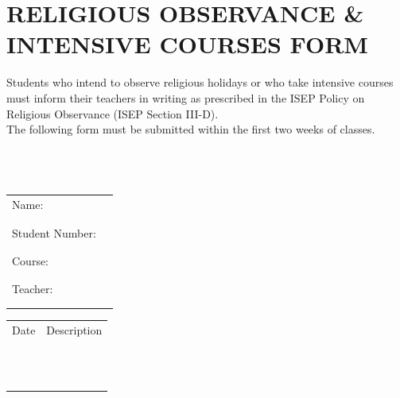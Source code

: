 \documentclass[10pt]{article}
\begin{document}
\newpage
\vspace*{\fill}

\section*{RELIGIOUS OBSERVANCE \& INTENSIVE COURSES FORM}

Students who intend to observe religious holidays or who take intensive courses must inform their teachers in writing as prescribed in the ISEP Policy on Religious Observance (ISEP Section III-D). \\

The following form must be submitted within the first two weeks of classes. \\ \\ \\ \\

\begin{tabular}{@{}p{1.5in}p{5in}}
Name: & \underline{\hspace{5in}} \\ \\ \\
Student Number: & \underline{\hspace{5in}} \\ \\ \\
Course: & \underline{\hspace{5in}} \\ \\ \\
Teacher: & \underline{\hspace{5in}} \\ \\ \\
\end{tabular}

\vspace{0.5in}

\begin{tabular}{@{}p{1.5in}p{5in}}
Date & Description \\ \\ \\
\underline{\hspace{1.5in}}& \underline{\hspace{5in}} \\
\\ \\
\underline{\hspace{1.5in}}& \underline{\hspace{5in}} \\
\\ \\
\underline{\hspace{1.5in}}& \underline{\hspace{5in}} \\
\\ \\
\underline{\hspace{1.5in}}& \underline{\hspace{5in}} \\
\end{tabular}
\vspace{3in}
\vspace*{\fill}
\end{document}
